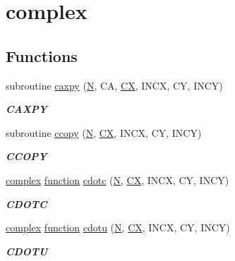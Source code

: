 \hypertarget{group__complex__blas__level1}{}\section{complex}
\label{group__complex__blas__level1}
\subsection*{Functions}
\begin{DoxyCompactItemize}
\item 
subroutine \hyperlink{group__complex__blas__level1_ga9605cb98791e2038fd89aaef63a31be1}{caxpy} (\hyperlink{polmisc_8c_a0240ac851181b84ac374872dc5434ee4}{N}, C\+A, \hyperlink{scsum1_8c_a5a76da95c549c41790389a76e12fdcb5}{C\+X}, I\+N\+C\+X, C\+Y, I\+N\+C\+Y)
\begin{DoxyCompactList}\small\item\em {\bfseries C\+A\+X\+P\+Y} \end{DoxyCompactList}\item 
subroutine \hyperlink{group__complex__blas__level1_ga6113a670d3df40b1b081af52af8c29e1}{ccopy} (\hyperlink{polmisc_8c_a0240ac851181b84ac374872dc5434ee4}{N}, \hyperlink{scsum1_8c_a5a76da95c549c41790389a76e12fdcb5}{C\+X}, I\+N\+C\+X, C\+Y, I\+N\+C\+Y)
\begin{DoxyCompactList}\small\item\em {\bfseries C\+C\+O\+P\+Y} \end{DoxyCompactList}\item 
\hyperlink{structcomplex}{complex} \hyperlink{afunc_8m_a7b5e596df91eadea6c537c0825e894a7}{function} \hyperlink{group__complex__blas__level1_ga0f02c96fa8498b4aa6b144deee725c0d}{cdotc} (\hyperlink{polmisc_8c_a0240ac851181b84ac374872dc5434ee4}{N}, \hyperlink{scsum1_8c_a5a76da95c549c41790389a76e12fdcb5}{C\+X}, I\+N\+C\+X, C\+Y, I\+N\+C\+Y)
\begin{DoxyCompactList}\small\item\em {\bfseries C\+D\+O\+T\+C} \end{DoxyCompactList}\item 
\hyperlink{structcomplex}{complex} \hyperlink{afunc_8m_a7b5e596df91eadea6c537c0825e894a7}{function} \hyperlink{group__complex__blas__level1_gadd72f1b633553acc77250e32bc704a78}{cdotu} (\hyperlink{polmisc_8c_a0240ac851181b84ac374872dc5434ee4}{N}, \hyperlink{scsum1_8c_a5a76da95c549c41790389a76e12fdcb5}{C\+X}, I\+N\+C\+X, C\+Y, I\+N\+C\+Y)
\begin{DoxyCompactList}\small\item\em {\bfseries C\+D\+O\+T\+U} \end{DoxyCompactList}\item 

\end{DoxyCompactItemize}
